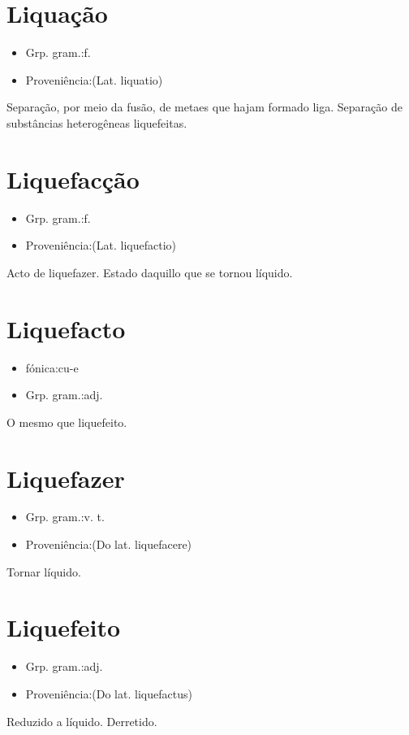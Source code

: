 \section{Liquação}
\begin{itemize}
\item {Grp. gram.:f.}
\end{itemize}
\begin{itemize}
\item {Proveniência:(Lat. \textunderscore liquatio\textunderscore )}
\end{itemize}
Separação, por meio da fusão, de metaes que hajam formado liga.
Separação de substâncias heterogêneas liquefeitas.
\section{Liquefacção}
\begin{itemize}
\item {Grp. gram.:f.}
\end{itemize}
\begin{itemize}
\item {Proveniência:(Lat. \textunderscore liquefactio\textunderscore )}
\end{itemize}
Acto de liquefazer.
Estado daquillo que se tornou líquido.
\section{Liquefacto}
\begin{itemize}
\item {fónica:cu-e}
\end{itemize}
\begin{itemize}
\item {Grp. gram.:adj.}
\end{itemize}
O mesmo que \textunderscore liquefeito\textunderscore .
\section{Liquefazer}
\begin{itemize}
\item {Grp. gram.:v. t.}
\end{itemize}
\begin{itemize}
\item {Proveniência:(Do lat. \textunderscore liquefacere\textunderscore )}
\end{itemize}
Tornar líquido.
\section{Liquefeito}
\begin{itemize}
\item {Grp. gram.:adj.}
\end{itemize}
\begin{itemize}
\item {Proveniência:(Do lat. \textunderscore liquefactus\textunderscore )}
\end{itemize}
Reduzido a líquido.
Derretido.
